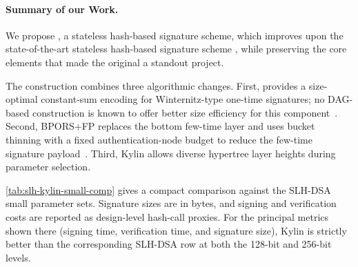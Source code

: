 


\paragraph{Summary of our Work.}
We propose \SPHINCSA, a stateless hash-based signature scheme, which improves upon the state-of-the-art stateless hash-based signature scheme \SPHINCSP, while preserving the core elements that made the original \SPHINCSP a standout project. 

The construction combines three algorithmic changes.  First, \WOTSCS provides
a size-optimal constant-sum encoding for Winternitz-type one-time signatures;
no DAG-based construction is known to offer better size efficiency for this
component~\cite{optimalwots}.  Second, BPORS+FP replaces the bottom few-time
layer and uses bucket thinning with a fixed authentication-node budget to reduce
the few-time signature payload~\cite{bucketthinning}.  Third, Kylin allows
diverse hypertree layer heights during parameter selection.

\cref{tab:slh-kylin-small-comp} gives a compact comparison against the
SLH-DSA small parameter sets.  Signature sizes are in bytes, and signing
and verification costs are reported as design-level hash-call proxies.  For
the principal metrics shown there (signing time, verification time, and
signature size), Kylin is strictly better than the corresponding SLH-DSA row at
both the 128-bit and 256-bit levels.

